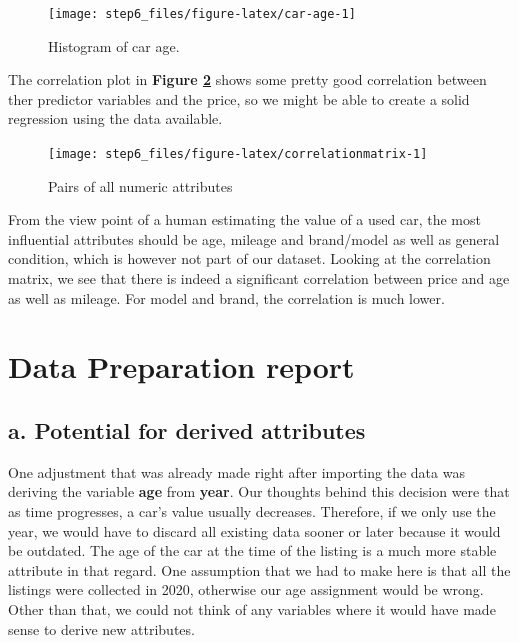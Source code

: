 \documentclass[sigchi]{acmart}
\begin{document}
\begin{figure}
\texttt{[image: step6\_files/figure-latex/car-age-1]} \caption{Histogram of car age.}\label{fig:car-age}
\end{figure}

The correlation plot in \textbf{Figure \ref{fig:correlationmatrix}} shows some pretty good correlation between ther predictor variables and the price, so we might be able to create a solid regression using the data available.

\begin{figure}
\texttt{[image: step6\_files/figure-latex/correlationmatrix-1]} \caption{Pairs of all numeric attributes}\label{fig:correlationmatrix}
\end{figure}

From the view point of a human estimating the value of a used car, the most influential attributes should be age, mileage and brand/model as well as general condition, which is however not part of our dataset. Looking at the correlation matrix, we see that there is indeed a significant correlation between price and age as well as mileage. For model and brand, the correlation is much lower.

\hypertarget{data-preparation-report}{%
\section{Data Preparation report}\label{data-preparation-report}}

\hypertarget{a.-potential-for-derived-attributes}{%
\subsection{a. Potential for derived attributes}\label{a.-potential-for-derived-attributes}}

One adjustment that was already made right after importing the data was deriving the variable \textbf{age} from \textbf{year}. Our thoughts behind this decision were that as time progresses, a car's value usually decreases. Therefore, if we only use the year, we would have to discard all existing data sooner or later because it would be outdated. The age of the car at the time of the listing is a much more stable attribute in that regard. One assumption that we had to make here is that all the listings were collected in 2020, otherwise our age assignment would be wrong.
Other than that, we could not think of any variables where it would have made sense to derive new attributes.
\end{document}
